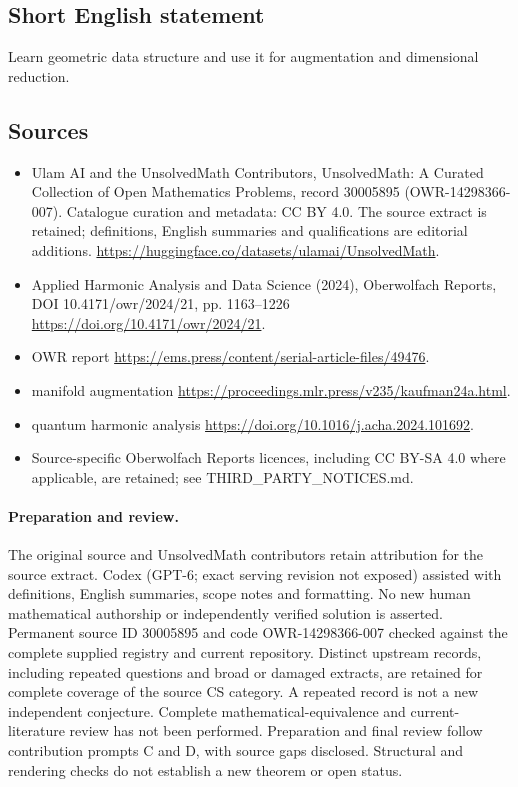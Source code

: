 \documentclass[11pt]{article}
\begin{document}
\subsection{Short English statement}
Learn geometric data structure and use it for augmentation and dimensional reduction.
\subsection{Sources}
\begin{itemize}
\item[\hypertarget{source:30005895:1}{S1}] Ulam AI and the UnsolvedMath Contributors, UnsolvedMath: A Curated Collection of Open Mathematics Problems, record 30005895 (OWR-14298366-007). Catalogue curation and metadata: CC BY 4.0. The source extract is retained; definitions, English summaries and qualifications are editorial additions.
\url{https://huggingface.co/datasets/ulamai/UnsolvedMath}.
\item[\hypertarget{source:30005895:2}{S2}] Applied Harmonic Analysis and Data Science (2024), Oberwolfach Reports, DOI 10.4171/owr/2024/21, pp. 1163--1226
\url{https://doi.org/10.4171/owr/2024/21}.
\item[\hypertarget{source:30005895:3}{S3}] OWR report
\url{https://ems.press/content/serial-article-files/49476}.
\item[\hypertarget{source:30005895:4}{S4}] manifold augmentation
\url{https://proceedings.mlr.press/v235/kaufman24a.html}.
\item[\hypertarget{source:30005895:5}{S5}] quantum harmonic analysis
\url{https://doi.org/10.1016/j.acha.2024.101692}.
\item Source-specific Oberwolfach Reports licences, including CC BY-SA 4.0 where applicable, are retained; see THIRD\_PARTY\_NOTICES.md.
\end{itemize}
\paragraph{Preparation and review.}
The original source and UnsolvedMath contributors retain attribution for the source extract. Codex (GPT-6; exact serving revision not exposed) assisted with definitions, English summaries, scope notes and formatting. No new human mathematical authorship or independently verified solution is asserted. Permanent source ID 30005895 and code OWR-14298366-007 checked against the complete supplied registry and current repository. Distinct upstream records, including repeated questions and broad or damaged extracts, are retained for complete coverage of the source CS category. A repeated record is not a new independent conjecture. Complete mathematical-equivalence and current-literature review has not been performed. Preparation and final review follow contribution prompts C and D, with source gaps disclosed. Structural and rendering checks do not establish a new theorem or open status.
\label{end:30005895}
\end{document}
